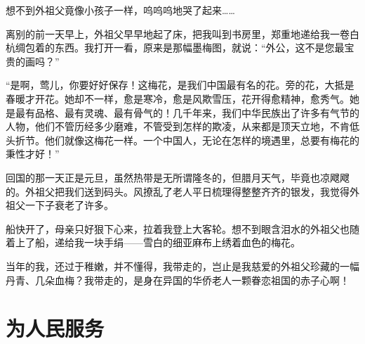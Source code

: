 \documentclass[12pt,UTF-8,openany]{ctexbook}
\begin{document}
\begin{large}
    想不到外祖父竟像小孩子一样，呜呜呜地哭了起来……
    
    离别的前一天早上，外祖父早早地起了床，把我叫到书房里，郑重地递给我一卷白杭绸包着的东西。我打开一看，原来是那幅墨梅图，就说：“外公，这不是您最宝贵的画吗？”
    
    “是啊，莺儿，你要好好保存！这梅花，是我们中国最有名的花。旁的花，大抵是春暖才开花。她却不一样，愈是寒冷，愈是风欺雪压，花开得愈精神，愈秀气。她是最有品格、最有灵魂、最有骨气的！几千年来，我们中华民族出了许多有气节的人物，他们不管历经多少磨难，不管受到怎样的欺凌，从来都是顶天立地，不肯低头折节。他们就像这梅花一样。一个中国人，无论在怎样的境遇里，总要有梅花的秉性才好！”
    
    回国的那一天正是元旦，虽然热带是无所谓隆冬的，但腊月天气，毕竟也凉飕飕的。外祖父把我们送到码头。风撩乱了老人平日梳理得整整齐齐的银发，我觉得外祖父一下子衰老了许多。
    
    船快开了，母亲只好狠下心来，拉着我登上大客轮。想不到眼含泪水的外祖父也随着上了船，递给我一块手绢——雪白的细亚麻布上绣着血色的梅花。
    
    当年的我，还过于稚嫩，并不懂得，我带走的，岂止是我慈爱的外祖父珍藏的一幅丹青、几朵血梅？我带走的，是身在异国的华侨老人一颗眷恋祖国的赤子心啊！
    
\end{large}



\chapter{为人民服务}
\end{document}
